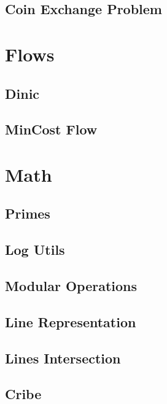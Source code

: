 \subsection{   Coin Exchange Problem}
\raggedbottom
\hrulefill

\section{Flows}
\subsection{  Dinic}
\raggedbottom
\hrulefill
\subsection{ MinCost Flow}
\raggedbottom
\hrulefill

\section{Math}
\subsection{ Primes}
\raggedbottom
\hrulefill
\subsection{Log Utils}
\raggedbottom
\hrulefill
\subsection{ Modular Operations}
\raggedbottom
\hrulefill
\subsection{   Line Representation}
\raggedbottom
\hrulefill
\subsection{ Lines Intersection}
\raggedbottom
\hrulefill
\subsection{Cribe}
\raggedbottom
\hrulefill
